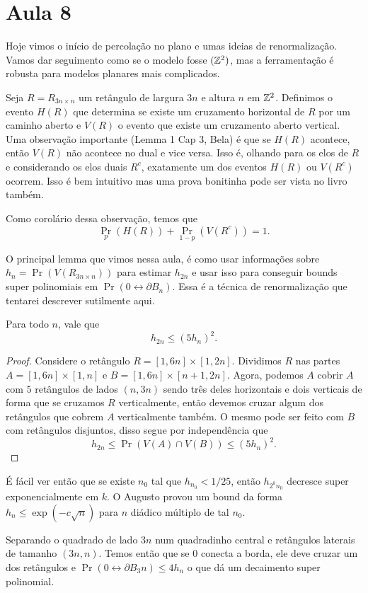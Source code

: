 \section{Aula 8}

Hoje vimos o início de percolação no plano e umas ideias de renormalização.
Vamos dar seguimento como se o modelo fosse $(\mathbb{Z}^2)$, mas a ferramentação
é robusta para modelos planares mais complicados.

Seja $R = R_{3n \times n}$ um retângulo de largura $3n$ e altura $n$
em $\mathbb{Z}^2$. Definimos
o evento $H(R)$ que determina se existe um cruzamento horizontal
de $R$ por um caminho aberto e $V(R)$ o evento que existe um
cruzamento aberto vertical.
Uma observação importante (Lemma 1 Cap 3, Bela) é que se $H(R)$ acontece,
então $V(R)$ não acontece no dual e vice versa. Isso é, olhando para
os elos de $R$
e considerando os elos duais $R^c$, exatamente um dos eventos $H(R)$
ou $V(R^c)$ ocorrem.
Isso é bem intuitivo mas uma prova bonitinha pode ser vista no livro também.

Como corolário dessa observação, temos que
\[
	\Pr_p(H(R)) + \Pr_{1-p}(V(R^c)) = 1.
\]

O principal lemma que vimos nessa aula, é como usar informações sobre
$h_n = \Pr(V(R_{3n \times n}))$
para estimar $h_{2n}$ e usar isso para conseguir bounds super
polinomiais em $\Pr(0 \leftrightarrow \partial B_n)$.
Essa é a técnica de renormalização que tentarei descrever sutilmente aqui.

\begin{lemma}[Renormalização]
	Para todo $n$, vale que
	\[
		h_{2n} \leq (5h_n)^2.
	\]
\end{lemma}
\begin{proof}
	Considere o retângulo $R = [1, 6n] \times [1, 2n]$. Dividimos $R$ nas partes
	$A = [1,6n] \times [1,n]$ e $B = [1,6n] \times [n+1,2n]$. Agora, podemos $A$
	cobrir $A$ com $5$ retângulos de lados $(n,3n)$ sendo três deles
	horizontais e dois
	verticais de forma que se cruzamos $R$ verticalmente, então devemos
	cruzar algum dos
	retângulos que cobrem $A$ verticalmente também.
	O mesmo pode ser feito com $B$ com retângulos disjuntos,
	disso segue por independência que
	\[
		h_{2n} \leq \Pr(V(A) \cap V(B)) \leq (5h_n)^2.
	\]
\end{proof}

É fácil ver então que se existe $n_0$ tal que $h_{n_0} < 1/25$, então
$h_{2^k n_0}$ decresce super exponencialmente em $k$. O Augusto provou um bound
da forma $h_n \leq \exp(-c \sqrt{n})$ para $n$ diádico múltiplo de tal $n_0$.

Separando o quadrado de lado $3n$ num quadradinho central e
retângulos laterais de tamanho $(3n,n)$.
Temos então que se $0$ conecta a borda, ele deve cruzar um dos retângulos e
$\Pr(0 \leftrightarrow \partial B_3n) \leq 4 h_{n}$  o que dá um
decaimento super polinomial.
